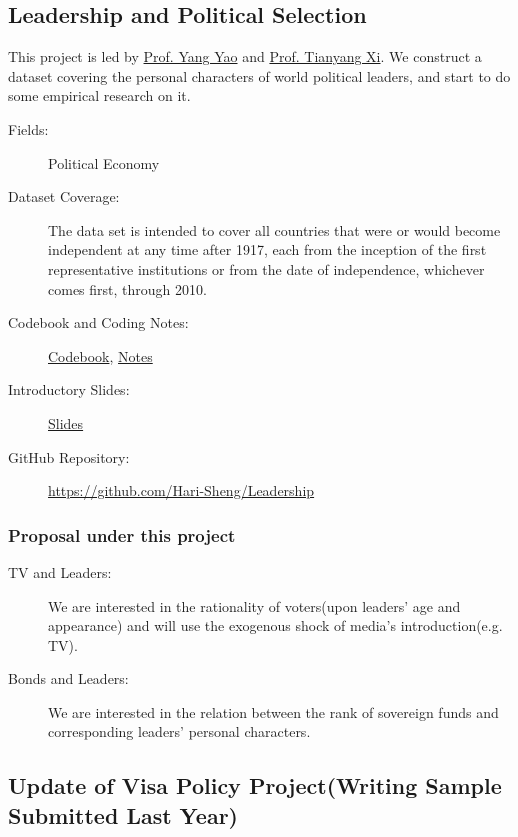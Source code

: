 \documentclass{article}
\begin{document}
\subsection{Leadership and Political Selection}
This project is led by \href{http://en.nsd.edu.cn/article.asp?articleid=6962}{Prof. Yang Yao} and \href{http://www.xitianyang.com}{Prof. Tianyang Xi}. We construct a dataset covering the personal characters of world political leaders, and start to do some empirical research on it.
\begin{description}
\item[Fields:] Political Economy
\item[Dataset Coverage:] The data set is intended to cover all countries that were or would become independent at any time after 1917, each from the inception of the first representative institutions or from the date of independence, whichever comes first, through 2010.
\item[Codebook and Coding Notes:] \href{http://shenghao.weebly.com/uploads/2/4/2/1/24218782/leaderships_and_political_selection-codebook.pdf}{Codebook}, \href{http://shenghao.weebly.com/uploads/2/4/2/1/24218782/notesofupdate.pdf}{Notes}
\item[Introductory Slides:] \href{http://shenghao.weebly.com/uploads/2/4/2/1/24218782/leadership_1950-2010-patterns.pdf}{Slides}
\item[GitHub Repository:] \url{https://github.com/Hari-Sheng/Leadership}
\end{description}


\subsubsection{Proposal under this project}
\begin{description}
\item[TV and Leaders:] We are interested in the rationality of voters(upon leaders' age and appearance) and will use the exogenous shock of media's introduction(e.g. TV).
\item[Bonds and Leaders:] We are interested in the relation between the rank of sovereign funds and corresponding leaders' personal characters.
\end{description}
\subsection{Update of Visa Policy Project(Writing Sample Submitted Last Year)}
\end{document}
